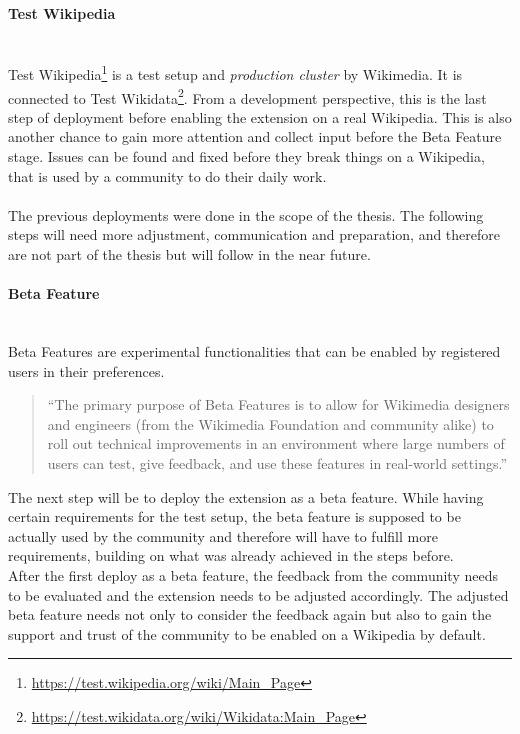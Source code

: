 \paragraph{Test Wikipedia} ~\\
Test Wikipedia\footnote{\url{https://test.wikipedia.org/wiki/Main_Page}} is a test setup and \textit{production cluster} by Wikimedia. It is connected to Test Wikidata\footnote{\url{https://test.wikidata.org/wiki/Wikidata:Main_Page}}. From a development perspective, this is the last step of deployment before enabling the extension on a real Wikipedia. This is also another chance to gain more attention and collect input before the Beta Feature stage. Issues can be found and fixed before they break things on a Wikipedia, that is used by a community to do their daily work. \\
\\
The previous deployments were done in the scope of the thesis. The following steps will need more adjustment, communication and preparation, and therefore are not part of the thesis but will follow in the near future. 

\paragraph{Beta Feature} ~\\
Beta Features are experimental functionalities that can be enabled by registered users in their preferences. 
\begin{quotation}
``The primary purpose of Beta Features is to allow for Wikimedia designers and engineers (from the Wikimedia Foundation and community alike) to roll out technical improvements in an environment where large numbers of users can test, give feedback, and use these features in real-world settings.'' \citep{wiki:04}
\end{quotation} 

The next step will be to deploy the extension as a beta feature. While having certain requirements for the test setup, the beta feature is supposed to be actually used by the community and therefore will have to fulfill more requirements, building on what was already achieved in the steps before. \\
After the first deploy as a beta feature, the feedback from the community needs to be evaluated and the extension needs to be adjusted accordingly. The adjusted beta feature needs not only to consider the feedback again but also to gain the support and trust of the community to be enabled on a Wikipedia by default.


